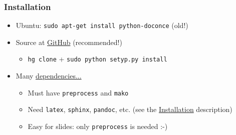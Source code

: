 \documentclass{beamer}
\newcounter{doconce:exercise:counter}
\newcounter{doconce:movie:counter}
\begin{document}
\begin{frame}
\frametitle{Installation}

\begin{itemize}
 \item Ubuntu: \Verb!sudo apt-get install python-doconce! (old!)

 \item Source at \href{{https://github.com/hplgit/doconce}}{GitHub} (recommended!)
\begin{itemize}

   \item \Verb!hg clone! + \Verb!sudo python setyp.py install!

\end{itemize}

\noindent
 \item Many \href{{http://hplgit.github.io/doconce/doc/pub/manual/html/manual.html#installation-of-doconce-and-its-dependencies}}{dependencies...}
\begin{itemize}

   \item Must have \Verb!preprocess! and \Verb!mako!

   \item Need \Verb!latex!, \Verb!sphinx!, \Verb!pandoc!, etc. (see the \href{{http://hplgit.github.io/doconce/doc/pub/manual/html/manual.html#installation-of-doconce-and-its-dependencies}}{Installation} description)

   \item Easy for slides: only \Verb!preprocess! is needed :-)
\end{itemize}

\noindent
\end{itemize}

\noindent
\end{frame}
\end{document}

